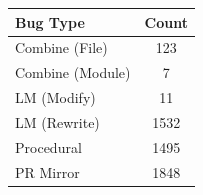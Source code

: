     \centering
    \begin{tabular}{l|c}
\toprule
Bug Type & Count \\
\midrule
Combine (File)   & 123  \\
Combine (Module) & 7    \\
LM (Modify)      & 11   \\
LM (Rewrite)     & 1532 \\
Procedural       & 1495 \\
PR Mirror        & 1848 \\
\bottomrule
    \end{tabular}
    \caption{
Bug types represented in final training dataset.
    }
    \label{tab:sft_final_bug_types}
